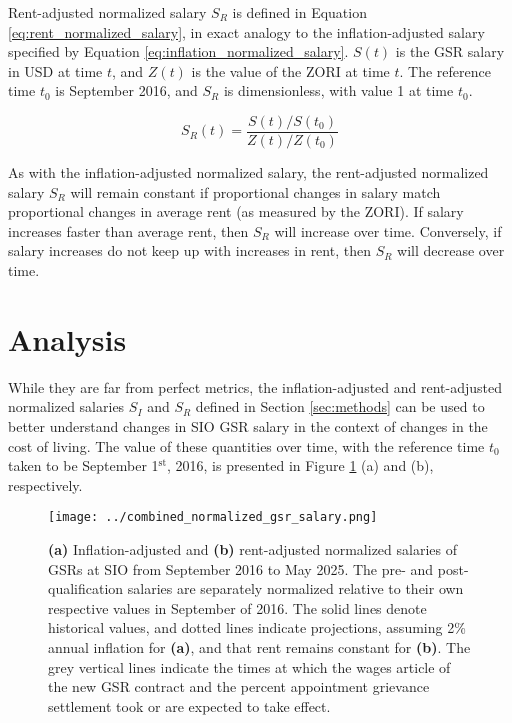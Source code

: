 \documentclass{article}
\begin{document}
Rent-adjusted normalized salary $S_R$ is defined in Equation \ref{eq:rent_normalized_salary}, in exact analogy to the inflation-adjusted salary specified by Equation \ref{eq:inflation_normalized_salary}. $S(t)$ is the GSR salary in USD at time $t$, and $Z(t)$ is the value of the ZORI at time $t$. The reference time $t_0$ is September 2016, and $S_R$ is dimensionless, with value 1 at time $t_0$.

\begin{equation}
	S_R(t) = \frac{S(t)/S(t_0)}{Z(t)/Z(t_0)}
	\label{eq:rent_normalized_salary}
\end{equation}

As with the inflation-adjusted normalized salary, the rent-adjusted normalized salary $S_R$ will remain constant if proportional changes in salary match proportional changes in average rent (as measured by the ZORI). If salary increases faster than average rent, then $S_R$ will increase over time. Conversely, if salary increases do not keep up with increases in rent, then $S_R$ will decrease over time.

\section{Analysis}

While they are far from perfect metrics, the inflation-adjusted and rent-adjusted normalized salaries $S_I$ and $S_R$ defined in Section \ref{sec:methods} can be used to better understand changes in SIO GSR salary in the context of changes in the cost of living. The value of these quantities over time, with the reference time $t_0$ taken to be September 1$^\text{st}$, 2016, is presented in Figure \ref{fig:normalized_salaries} (a) and (b), respectively. 

\begin{figure}[H]
	\centering
	\texttt{[image: ../combined\_normalized\_gsr\_salary.png]}
	\caption{\textbf{(a)} Inflation-adjusted and \textbf{(b)} rent-adjusted normalized salaries of GSRs at SIO from September 2016 to May 2025. The pre- and post-qualification salaries are separately normalized relative to their own respective values in September of 2016. The solid lines denote historical values, and dotted lines indicate projections, assuming 2\% annual inflation for \textbf{(a)}, and that rent remains constant for \textbf{(b)}. The grey vertical lines indicate the times at which the wages article of the new GSR contract and the percent appointment grievance settlement took or are expected to take effect.}
	\label{fig:normalized_salaries}
\end{figure}
\end{document}
